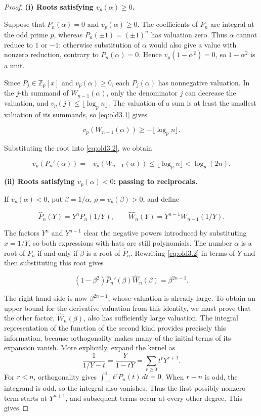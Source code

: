 \documentclass[11pt,a4paper]{article}
\numberwithin{equation}{section}
\theoremstyle{definition}
\begin{document}
\begin{proof}
\textbf{(i) Roots satisfying \(v_p(\alpha)\ge0\).}

Suppose that \(P_n(\alpha)=0\) and \(v_p(\alpha)\ge0\). The coefficients of \(P_n\) are integral at the odd prime \(p\), whereas \(P_n(\pm1)=(\pm1)^n\) has valuation zero. Thus \(\alpha\) cannot reduce to \(1\) or \(-1\): otherwise substitution of \(\alpha\) would also give a value with nonzero reduction, contrary to \(P_n(\alpha)=0\). Hence \(v_p(1-\alpha^2)=0\), so \(1-\alpha^2\) is a unit.

Since \(P_j\in\mathbb Z_p[x]\) and \(v_p(\alpha)\ge0\), each \(P_j(\alpha)\) has nonnegative valuation. In the \(j\)-th summand of \(W_{n-1}(\alpha)\), only the denominator \(j\) can decrease the valuation, and \(v_p(j)\le\lfloor\log_p n\rfloor\). The valuation of a sum is at least the smallest valuation of its summands, so \eqref{eq:old3.1} gives

\[
v_p(W_{n-1}(\alpha))\ge-\lfloor\log_p n\rfloor.
\]

Substituting the root into \eqref{eq:old3.2}, we obtain

\begin{equation}
v_p(P_n'(\alpha))
=-v_p(W_{n-1}(\alpha))
\le\lfloor\log_p n\rfloor<\log_p(2n).
\label{eq:old4.2}
\end{equation}

\textbf{(ii) Roots satisfying \(v_p(\alpha)<0\): passing to reciprocals.}

If \(v_p(\alpha)<0\), put \(\beta=1/\alpha\), \(\rho=v_p(\beta)>0\), and define

\[
\widehat P_n(Y)=Y^nP_n(1/Y),\qquad
\widehat W_n(Y)=Y^{n-1}W_{n-1}(1/Y).
\]

The factors \(Y^n\) and \(Y^{n-1}\) clear the negative powers introduced by substituting \(x=1/Y\), so both expressions with hats are still polynomials. The number \(\alpha\) is a root of \(P_n\) if and only if \(\beta\) is a root of \(\widehat P_n\). Rewriting \eqref{eq:old3.2} in terms of \(Y\) and then substituting this root gives

\begin{equation}
(1-\beta^2)\widehat P_n'(\beta)\widehat W_n(\beta)
=\beta^{2n-1}.
\label{eq:old4.3}
\end{equation}

The right-hand side is now \(\beta^{2n-1}\), whose valuation is already large. To obtain an upper bound for the derivative valuation from this identity, we must prove that the other factor, \(\widehat W_n(\beta)\), also has sufficiently large valuation. The integral representation of the function of the second kind provides precisely this information, because orthogonality makes many of the initial terms of its expansion vanish. More explicitly, expand the kernel as
\[
\frac1{1/Y-t}=\frac{Y}{1-tY}=\sum_{r\ge0}t^rY^{r+1}.
\]
For \(r<n\), orthogonality gives \(\int_{-1}^1 t^rP_n(t)\,dt=0\). When \(r-n\) is odd, the integrand is odd, so the integral also vanishes. Thus the first possibly nonzero term starts at \(Y^{n+1}\), and subsequent terms occur at every other degree. This gives


\end{proof}
\end{document}
